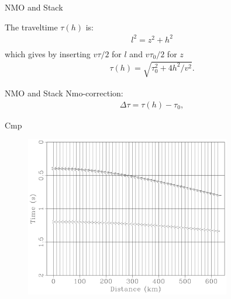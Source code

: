 \documentclass[xcolor=dvipsnames,notes]{beamer}
\begin{document}
\begin{frame}{NMO and Stack}
\begin{figure}
\label{fig:nmop}
\end{figure}

The traveltime $\tau(h)$ is:
%
\begin{eqnarray}
l^2 = z^2+h^2 \nonumber\\
\end{eqnarray}
which gives by inserting $v\tau/2$ for $l$ and $v\tau_0/2$ for $z$
\begin{eqnarray}
\tau(h)=\sqrt{\tau^2_0+4h^2/v^2}.
\label{eq:nmo}
\end{eqnarray}
\end{frame}
\begin{frame}{NMO and Stack}
Nmo-correction:
%
\begin{eqnarray}
 \Delta \tau = \tau(h)-\tau_0,
\label{eq:dtnmo}
\end{eqnarray}
\end{frame}
%
\begin{frame}{Cmp}
\begin{figure}
  \includegraphics[width=0.8\textwidth]{Fig/synshot.pdf}
  \caption{}
  \label{fig:synshot}
\end{figure}
\end{frame}
\end{document}
